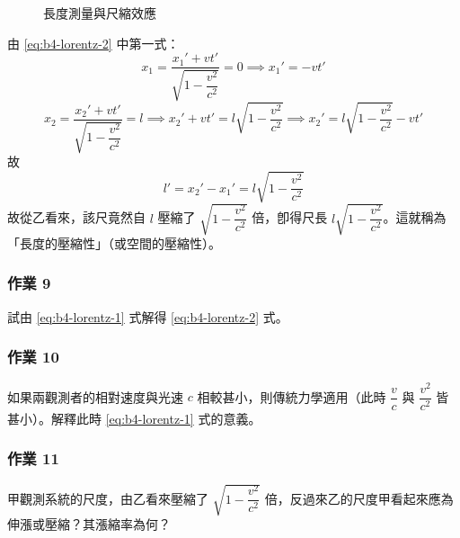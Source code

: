 \begin{enumerate}[(i)]
\begin{figure}[H]
  \caption{長度測量與尺縮效應}
  \label{fig:b4-2-8}
  \end{figure}

  由 \eqref{eq:b4-lorentz-2} 中第一式：
  \[ x_1 = \frac{x_1' + vt'}{\sqrt{1 - \dfrac{v^2}{c^2}}} = 0 \implies x_1' = -vt' \]
  \[ x_2 = \frac{x_2' + vt'}{\sqrt{1 - \dfrac{v^2}{c^2}}} = l \implies x_2' + vt' = l\sqrt{1 - \frac{v^2}{c^2}} \implies x_2' = l\sqrt{1 - \frac{v^2}{c^2}} - vt' \]
  故
  \[ l' = x_2' - x_1' = l\sqrt{1 - \frac{v^2}{c^2}} \]
  故從乙看來，該尺竟然自 $l$ 壓縮了 $\sqrt{1 - \dfrac{v^2}{c^2}}$ 倍，卽得尺長 $l\sqrt{1 - \dfrac{v^2}{c^2}}$。這就稱為「長度的壓縮性」（或空間的壓縮性）。
\end{enumerate}

\subsubsection*{作業 9}
試由 \eqref{eq:b4-lorentz-1} 式解得 \eqref{eq:b4-lorentz-2} 式。

\subsubsection*{作業 10}
如果兩觀測者的相對速度與光速 $c$ 相較甚小，則傳統力學適用（此時 $\dfrac{v}{c}$ 與 $\dfrac{v^2}{c^2}$ 皆甚小）。解釋此時 \eqref{eq:b4-lorentz-1} 式的意義。

\subsubsection*{作業 11}
甲觀測系統的尺度，由乙看來壓縮了 $\sqrt{1 - \dfrac{v^2}{c^2}}$ 倍，反過來乙的尺度甲看起來應為伸漲或壓縮？其漲縮率為何？


